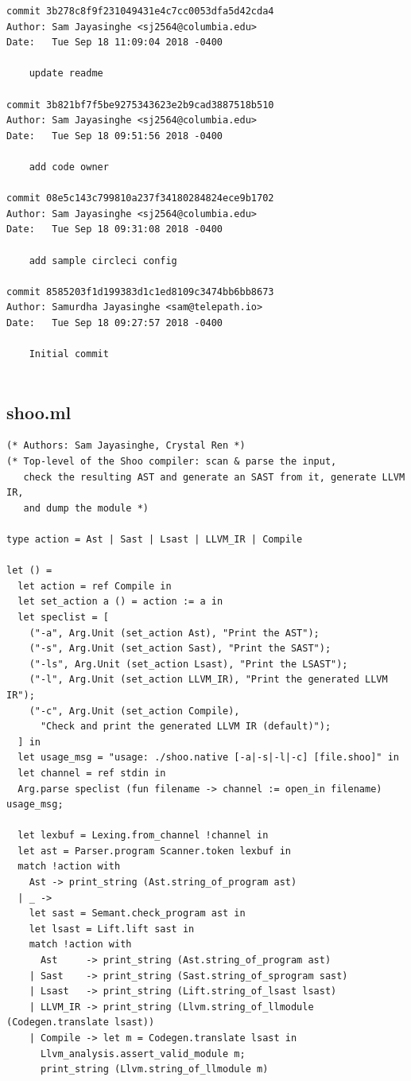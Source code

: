 \documentclass[12pt]{article}
\begin{document}
\begin{lstlisting}
commit 3b278c8f9f231049431e4c7cc0053dfa5d42cda4
Author: Sam Jayasinghe <sj2564@columbia.edu>
Date:   Tue Sep 18 11:09:04 2018 -0400

    update readme

commit 3b821bf7f5be9275343623e2b9cad3887518b510
Author: Sam Jayasinghe <sj2564@columbia.edu>
Date:   Tue Sep 18 09:51:56 2018 -0400

    add code owner

commit 08e5c143c799810a237f34180284824ece9b1702
Author: Sam Jayasinghe <sj2564@columbia.edu>
Date:   Tue Sep 18 09:31:08 2018 -0400

    add sample circleci config

commit 8585203f1d199383d1c1ed8109c3474bb6bb8673
Author: Samurdha Jayasinghe <sam@telepath.io>
Date:   Tue Sep 18 09:27:57 2018 -0400

    Initial commit


\end{lstlisting}

\lstset{language=Java}

\subsection{shoo.ml}
\begin{mdframed}[hidealllines=true,backgroundcolor=blue!20]
\begin{lstlisting}
(* Authors: Sam Jayasinghe, Crystal Ren *)
(* Top-level of the Shoo compiler: scan & parse the input,
   check the resulting AST and generate an SAST from it, generate LLVM IR,
   and dump the module *)

type action = Ast | Sast | Lsast | LLVM_IR | Compile

let () =
  let action = ref Compile in
  let set_action a () = action := a in
  let speclist = [
    ("-a", Arg.Unit (set_action Ast), "Print the AST");
    ("-s", Arg.Unit (set_action Sast), "Print the SAST");
    ("-ls", Arg.Unit (set_action Lsast), "Print the LSAST");
    ("-l", Arg.Unit (set_action LLVM_IR), "Print the generated LLVM IR");
    ("-c", Arg.Unit (set_action Compile),
      "Check and print the generated LLVM IR (default)");
  ] in  
  let usage_msg = "usage: ./shoo.native [-a|-s|-l|-c] [file.shoo]" in
  let channel = ref stdin in
  Arg.parse speclist (fun filename -> channel := open_in filename) usage_msg;
  
  let lexbuf = Lexing.from_channel !channel in
  let ast = Parser.program Scanner.token lexbuf in  
  match !action with
    Ast -> print_string (Ast.string_of_program ast)
  | _ ->
    let sast = Semant.check_program ast in
    let lsast = Lift.lift sast in
    match !action with
      Ast     -> print_string (Ast.string_of_program ast)
    | Sast    -> print_string (Sast.string_of_sprogram sast)
    | Lsast   -> print_string (Lift.string_of_lsast lsast)
    | LLVM_IR -> print_string (Llvm.string_of_llmodule (Codegen.translate lsast))
    | Compile -> let m = Codegen.translate lsast in
      Llvm_analysis.assert_valid_module m;
      print_string (Llvm.string_of_llmodule m)
\end{lstlisting}
\end{mdframed}
\end{document}
